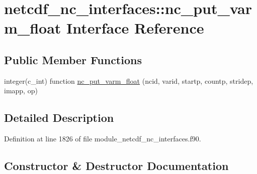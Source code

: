 \hypertarget{interfacenetcdf__nc__interfaces_1_1nc__put__varm__float}{}\section{netcdf\+\_\+nc\+\_\+interfaces\+:\+:nc\+\_\+put\+\_\+varm\+\_\+float Interface Reference}
\label{interfacenetcdf__nc__interfaces_1_1nc__put__varm__float}
\subsection*{Public Member Functions}
\begin{DoxyCompactItemize}
\item 
integer(c\+\_\+int) function \hyperlink{interfacenetcdf__nc__interfaces_1_1nc__put__varm__float_a69fade66d6c565c4962bd22465bb2422}{nc\+\_\+put\+\_\+varm\+\_\+float} (ncid, varid, startp, countp, stridep, imapp, op)
\end{DoxyCompactItemize}


\subsection{Detailed Description}


Definition at line 1826 of file module\+\_\+netcdf\+\_\+nc\+\_\+interfaces.\+f90.



\subsection{Constructor \& Destructor Documentation}
\mbox{\label{interfacenetcdf__nc__interfaces_1_1nc__put__varm__float_a69fade66d6c565c4962bd22465bb2422}} 

